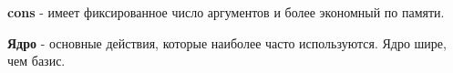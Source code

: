 \begin{figure}[ht!]
\end{figure}

\textbf{cons} - имеет фиксированное число аргументов и более экономный по памяти.

\textbf{Ядро} - основные действия, которые наиболее часто используются. Ядро шире, чем базис.